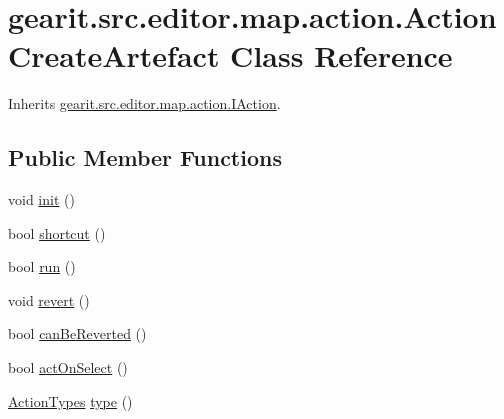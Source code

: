 \hypertarget{classgearit_1_1src_1_1editor_1_1map_1_1action_1_1_action_create_artefact}{\section{gearit.\+src.\+editor.\+map.\+action.\+Action\+Create\+Artefact Class Reference}
\label{classgearit_1_1src_1_1editor_1_1map_1_1action_1_1_action_create_artefact}
}


Inherits \hyperlink{interfacegearit_1_1src_1_1editor_1_1map_1_1action_1_1_i_action}{gearit.\+src.\+editor.\+map.\+action.\+I\+Action}.

\subsection*{Public Member Functions}
\begin{DoxyCompactItemize}
\item 
void \hyperlink{classgearit_1_1src_1_1editor_1_1map_1_1action_1_1_action_create_artefact_a9e9085bb65a52dd7479476bb721a2c99}{init} ()
\item 
bool \hyperlink{classgearit_1_1src_1_1editor_1_1map_1_1action_1_1_action_create_artefact_a466e77d7c6018724b7ff7c2f22125ff2}{shortcut} ()
\item 
bool \hyperlink{classgearit_1_1src_1_1editor_1_1map_1_1action_1_1_action_create_artefact_acf151d79c417430cf95f8bc1bb19e6ac}{run} ()
\item 
void \hyperlink{classgearit_1_1src_1_1editor_1_1map_1_1action_1_1_action_create_artefact_ab7c11f75375908209420f841d407243a}{revert} ()
\item 
bool \hyperlink{classgearit_1_1src_1_1editor_1_1map_1_1action_1_1_action_create_artefact_a8e6232f17fb8d3de6162be8e04bb4406}{can\+Be\+Reverted} ()
\item 
bool \hyperlink{classgearit_1_1src_1_1editor_1_1map_1_1action_1_1_action_create_artefact_ac2b28fb6f0f7136d9e5f68665d961ea3}{act\+On\+Select} ()
\item 
\hyperlink{namespacegearit_1_1src_1_1editor_1_1map_1_1action_af036712a7d960b13d1e31954e65c00e3}{Action\+Types} \hyperlink{classgearit_1_1src_1_1editor_1_1map_1_1action_1_1_action_create_artefact_adf8c1abd2f9b9bb7a184ada35eb731bf}{type} ()
\end{DoxyCompactItemize}



